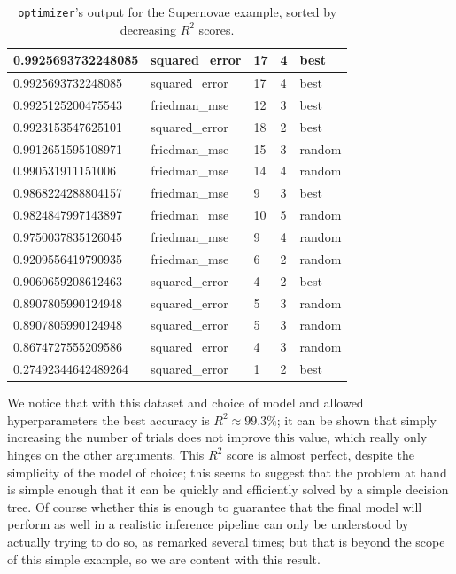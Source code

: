 \begin{table}[H]
\begin{tabular}{|l|l|l|l|l|}
        0.9925693732248085 & squared\_error & 17 & 4 & best \\ \hline
        0.9925693732248085 & squared\_error & 17 & 4 & best \\ \hline
        0.9925125200475543 & friedman\_mse & 12 & 3 & best \\ \hline
        0.9923153547625101 & squared\_error & 18 & 2 & best \\ \hline
        0.9912651595108971 & friedman\_mse & 15 & 3 & random \\ \hline
        0.990531911151006 & friedman\_mse & 14 & 4 & random \\ \hline
        0.9868224288804157 & friedman\_mse & 9 & 3 & best \\ \hline
        0.9824847997143897 & friedman\_mse & 10 & 5 & random \\ \hline
        0.9750037835126045 & friedman\_mse & 9 & 4 & random \\ \hline
        0.9209556419790935 & friedman\_mse & 6 & 2 & random \\ \hline
        0.9060659208612463 & squared\_error & 4 & 2 & best \\ \hline
        0.8907805990124948 & squared\_error & 5 & 3 & random \\ \hline
        0.8907805990124948 & squared\_error & 5 & 3 & random \\ \hline
        0.8674727555209586 & squared\_error & 4 & 3 & random \\ \hline
        0.27492344642489264 & squared\_error & 1 & 2 & best \\ \hline
    \end{tabular}
    \caption{\texttt{optimizer}'s output for the Supernovae example, sorted by decreasing $R^2$ scores.}
    \label{tab:sn_optuna}
\end{table}
We notice that with this dataset and choice of model and allowed hyperparameters the best accuracy is $R^2\approx 99.3\%$; it can be shown that simply increasing the number of trials does not improve this value, which really only hinges on the other arguments. 
This $R^2$ score is almost perfect, despite the simplicity of the model of choice; this seems to suggest that the problem at hand is simple enough that it can be quickly and efficiently solved by a simple decision tree. Of course whether this is enough to guarantee that the final model will perform as well in a realistic inference pipeline can only be understood by actually trying to do so, as remarked several times; but that is beyond the scope of this simple example, so we are content with this result.

